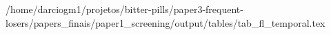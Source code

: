 /home/darciogm1/projetos/bitter-pills/paper3-frequent-losers/papers_finais/paper1_screening/output/tables/tab_fl_temporal.tex